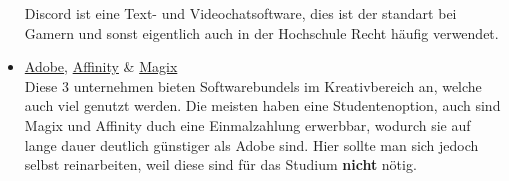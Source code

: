 \begin{itemize}
    Discord ist eine Text- und Videochatsoftware, dies ist der standart bei Gamern und sonst eigentlich auch in der Hochschule Recht häufig verwendet. 
    \item \href{https://www.adobe.com/de/creativecloud/buy/students.html?promoid=65FN7X8B&mv=other}{Adobe}, \href{https://affinity.serif.com/de/}{Affinity} \& \href{https://www.magix.com/de/education/}{Magix}\\
    Diese 3 unternehmen bieten Softwarebundels im Kreativbereich an, welche auch viel genutzt werden. Die meisten haben eine Studentenoption, auch sind Magix und Affinity duch eine Einmalzahlung erwerbbar, wodurch sie auf lange dauer deutlich günstiger als Adobe sind. Hier sollte man sich jedoch selbst reinarbeiten, weil diese sind für das Studium \textbf{nicht} nötig.
\end{itemize}
